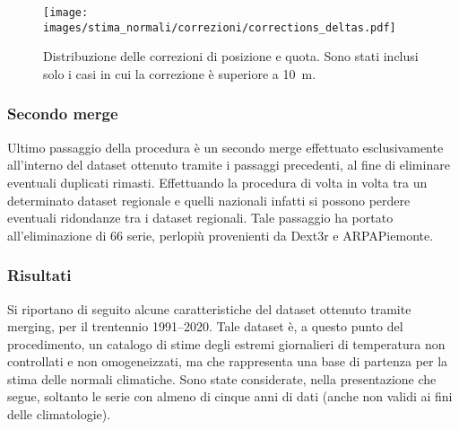 \begin{figure}[ht]
  \centering
  \texttt{[image: images/stima\_normali/correzioni/corrections\_deltas.pdf]}
  \caption{\small Distribuzione delle correzioni di posizione e quota. Sono stati inclusi solo i casi in cui la correzione è superiore a \qty{10}{\meter}.}\label{fig:corrections-deltas}
\end{figure}

%   

\subsubsection{Secondo merge}
Ultimo passaggio della procedura è un secondo merge effettuato esclusivamente all'interno del dataset ottenuto tramite i passaggi precedenti, al fine di eliminare eventuali duplicati rimasti. Effettuando la procedura di volta in volta tra un determinato dataset regionale e quelli nazionali infatti si possono perdere eventuali ridondanze tra i dataset regionali. Tale passaggio ha portato all'eliminazione di 66 serie, perlopiù provenienti da Dext3r e ARPAPiemonte.

\subsubsection{Risultati}\label{ch:results}
Si riportano di seguito alcune caratteristiche del dataset ottenuto tramite merging, per il trentennio 1991--2020. Tale dataset è, a questo punto del procedimento, un catalogo di stime degli estremi giornalieri di temperatura non controllati e non omogeneizzati, ma che rappresenta una base di partenza per la stima delle normali climatiche. Sono state considerate, nella presentazione che segue, soltanto le serie con almeno di cinque anni di dati (anche non validi ai fini delle climatologie).

